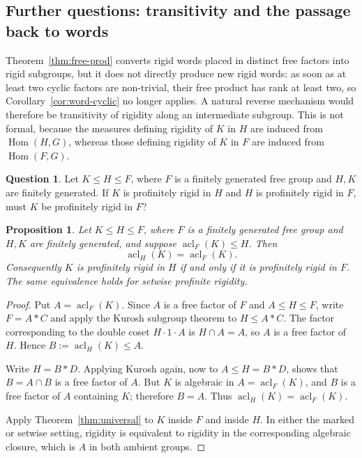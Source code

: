\documentclass[11pt]{amsart}
\theoremstyle{plain}
\newtheorem{proposition}[theorem]{Proposition}
\theoremstyle{definition}
\newtheorem{question}[theorem]{Question}
\newcommand{\acl}{\operatorname{acl}}
\newcommand{\Hom}{\operatorname{Hom}}
\begin{document}
\subsection{Further questions: transitivity and the passage back to words}
\label{sec:back-to-words}


Theorem~\ref{thm:free-prod} converts rigid words placed in distinct free factors
into rigid subgroups, but it does not directly produce new rigid words: as soon
as at least two cyclic factors are non-trivial, their free product has rank at
least two, so Corollary~\ref{cor:word-cyclic} no longer applies. A natural
reverse mechanism would therefore be transitivity of rigidity along an
intermediate subgroup. This is not formal, because the measures defining
rigidity of $K$ in $H$ are induced from $\Hom(H,G)$, whereas those defining
rigidity of $K$ in $F$ are induced from $\Hom(F,G)$.

\begin{question}\label{q:transitivity}
Let $K\le H\le F$, where $F$ is a finitely generated free group and $H,K$ are
finitely generated. If $K$ is profinitely rigid in $H$ and $H$ is profinitely
rigid in $F$, must $K$ be profinitely rigid in $F$?
\end{question}

\begin{proposition}\label{prop:acl-intermediate}
Let $K\le H\le F$, where $F$ is a finitely generated free group and $H,K$ are
finitely generated, and suppose $\acl_F(K)\le H$. Then
\[
  \acl_H(K)=\acl_F(K).
\]
Consequently $K$ is profinitely rigid in $H$ if and only if it is profinitely
rigid in $F$. The same equivalence holds for setwise profinite rigidity.
\end{proposition}

\begin{proof}
Put $A=\acl_F(K)$. Since $A$ is a free factor of $F$ and
$A\le H\le F$, write $F=A*C$ and apply the Kurosh subgroup theorem to
$H\le A*C$. The factor corresponding to the double coset $H\cdot1\cdot A$ is
$H\cap A=A$, so $A$ is a free factor of $H$. Hence
$B:=\acl_H(K)\le A$.

Write $H=B*D$. Applying Kurosh again, now to $A\le H=B*D$, shows that
$B=A\cap B$ is a free factor of $A$. But $K$ is algebraic in
$A=\acl_F(K)$, and $B$ is a free factor of $A$ containing $K$; therefore
$B=A$. Thus $\acl_H(K)=\acl_F(K)$.

Apply Theorem~\ref{thm:universal} to $K$ inside $F$ and inside $H$. In either
the marked or setwise setting, rigidity is equivalent to rigidity in the
corresponding algebraic closure, which is $A$ in both ambient groups.
\end{proof}
\end{document}

